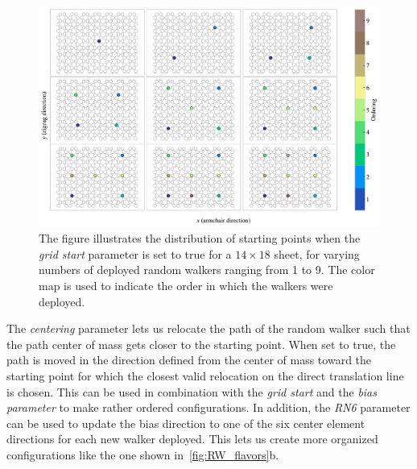 \begin{figure}[!htb]
  \centering
  \includegraphics[width=0.90\linewidth]{figures/system/grid_start.pdf}
  \caption{The figure illustrates the distribution of starting points when the \textit{grid start} parameter is set to true for a $14\times 18$ sheet, for varying numbers of deployed random walkers ranging from 1 to 9. The color map is used to indicate the order in which the walkers were deployed.}
  \label{fig:grid_start}
\end{figure}

The \textit{centering} parameter lets us relocate the path of the random walker
such that the path center of mass gets closer to the starting point. When set to true, the path is moved in the direction defined from the center of mass toward 
the starting point for which the closest valid relocation on the direct
translation line is chosen. This can be used in combination with the
\textit{grid start} and the \textit{bias parameter} to make rather ordered
configurations. In addition, the \textit{RN6} parameter can be used to update
the bias direction to one of the six center element directions for each new
walker deployed. This lets us create more organized configurations like the one shown
in~\cref{fig:RW_flavors}\textcolor{red!50!black}{b}. 


